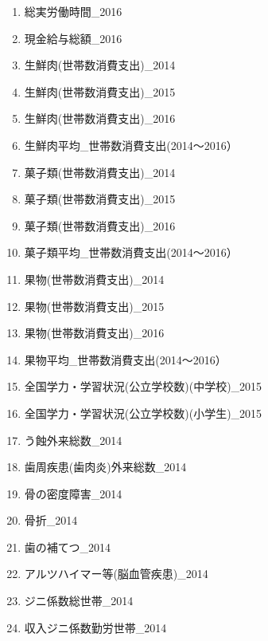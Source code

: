 \begin{enumerate}
  \item  総実労働時間\_2016
  \item  現金給与総額\_2016
  \item  生鮮肉(世帯数消費支出)\_2014
  \item  生鮮肉(世帯数消費支出)\_2015
  \item  生鮮肉(世帯数消費支出)\_2016
  \item  生鮮肉平均\_世帯数消費支出(2014〜2016）
  \item  菓子類(世帯数消費支出)\_2014
  \item  菓子類(世帯数消費支出)\_2015
  \item  菓子類(世帯数消費支出)\_2016
  \item  菓子類平均\_世帯数消費支出(2014〜2016）
  \item  果物(世帯数消費支出)\_2014
  \item  果物(世帯数消費支出)\_2015
  \item  果物(世帯数消費支出)\_2016
  \item  果物平均\_世帯数消費支出(2014〜2016）
  \item  全国学力・学習状況(公立学校数)(中学校)\_2015
  \item  全国学力・学習状況(公立学校数)(小学生)\_2015
  \item  う蝕外来総数\_2014
  \item  歯周疾患(歯肉炎)外来総数\_2014
  \item  骨の密度障害\_2014
  \item  骨折\_2014
  \item  歯の補てつ\_2014
  \item  アルツハイマー等(脳血管疾患)\_2014
  \item  ジニ係数総世帯\_2014
  \item  収入ジニ係数勤労世帯\_2014
\end{enumerate}


